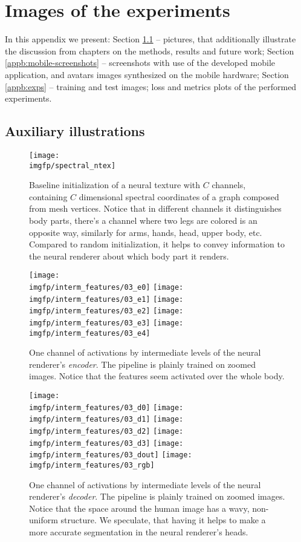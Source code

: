 \chapter{Images of the experiments}
In this appendix we present: Section \ref{appb:fig} -- pictures, that additionally illustrate the discussion from chapters on the methods, results and future work; Section \ref{appb:mobile-screenshots} -- screenshots with use of the developed mobile application, and avatars images synthesized on the mobile hardware; Section \ref{appb:exps} -- training and test images; loss and metrics plots of the performed experiments.
\section{Auxiliary illustrations}
\label{appb:fig}
\begin{figure}[!h]
	\centering
	\texttt{[image: \\imgfp/spectral\_ntex]}
	\caption{Baseline initialization of a neural texture with $C$ channels, containing $C$ dimensional spectral coordinates of a graph composed from mesh vertices. Notice that in different channels it distinguishes body parts, there's a channel where two legs are colored is an opposite way, similarly for arms, hands, head, upper body, etc. Compared to random initialization, it helps to convey information to the neural renderer about which body part it renders.}
	\label{fig:spectral_ntex}
\end{figure}
\begin{figure}
	\centering
	\texttt{[image: \\imgfp/interm\_features/03\_e0]}%
	\hfill\texttt{[image: \\imgfp/interm\_features/03\_e1]}%
	\hfill\texttt{[image: \\imgfp/interm\_features/03\_e2]}%
	\hfill\texttt{[image: \\imgfp/interm\_features/03\_e3]}%
	\hfill\texttt{[image: \\imgfp/interm\_features/03\_e4]}%
	\caption{One channel of activations by intermediate levels of the neural renderer's \textit{encoder}. The pipeline is plainly trained on zoomed images. Notice that the features seem activated over the whole body.}
	\label{fig:interm03_encoder}
\end{figure}
\begin{figure}
	\centering
	\texttt{[image: \\imgfp/interm\_features/03\_d0]}%
	\hfill\texttt{[image: \\imgfp/interm\_features/03\_d1]}%
	\hfill\texttt{[image: \\imgfp/interm\_features/03\_d2]}%
	\hfill\texttt{[image: \\imgfp/interm\_features/03\_d3]}%
	\hfill\texttt{[image: \\imgfp/interm\_features/03\_dout]}%
	\hfill\texttt{[image: \\imgfp/interm\_features/03\_rgb]}
	\caption{One channel of activations by intermediate levels of the neural renderer's \textit{decoder}. The pipeline is plainly trained on zoomed images. Notice that the space around the human image has a wavy, non-uniform structure. We speculate, that having it helps to make a more accurate segmentation in the neural renderer's heads. }
	\label{fig:interm03_decoder}
\end{figure}
